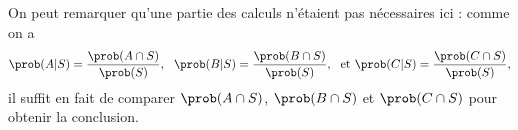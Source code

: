 {{    On peut remarquer qu'une partie des calculs n'étaient pas nécessaires ici : comme on a 
        $$\prob(A|S) = \frac {\prob(A\cap S)}{\prob(S)},~~ \prob(B|S) = \frac {\prob(B\cap S)}{\prob(S)},
            ~~ \text{et } \prob(C|S) = \frac {\prob(C\cap S)}{\prob(S)},$$
    il suffit en fait de comparer $\prob(A\cap S)$, $\prob(B\cap S)$ et $\prob(C\cap S)$ pour obtenir la conclusion.}
}

